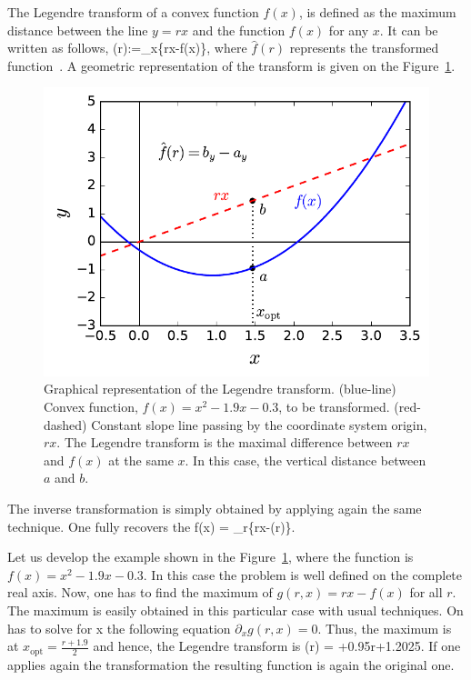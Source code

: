 The Legendre transform of a convex function $f(x)$, is defined as the maximum distance between the line $y=rx$ and the function $f(x)$ for any $x$.
It can be written as follows,
\be
  (r):=\max_{x}\{rx-f(x)\},
\ee
where $\hat{f}(r)$ represents the transformed function~\cite{Rockafellar1996}.
A geometric representation of the transform is given on the Figure~\ref{fig:lt-geometric-legendre}.

\begin{figure}[htp]
  \centering
  \includegraphics[scale=.65]{img/AP_legendre.pdf}
  \caption[Graphical representation of the Legendre transform.]{Graphical representation of the Legendre transform. (blue-line) Convex function, $f(x)=x^2-1.9x-0.3$, to be transformed. (red-dashed) Constant slope line passing by the coordinate system origin, $rx$. The Legendre transform is the maximal difference between $rx$ and $f(x)$ at the same $x$. In this case, the vertical distance between $a$ and $b$.}
  \label{fig:lt-geometric-legendre}
\end{figure}

The inverse transformation is simply obtained by applying again the same technique.
One fully recovers the
\be
  f(x) = \max_{r}\{rx-(r)\}.
\ee

Let us develop the example shown in the Figure~\ref{fig:lt-geometric-legendre}, where the function is $f(x)=x^2-1.9x-0.3$.
In this case the problem is well defined on the complete real axis.
Now, one has to find the maximum of $g(r,x)=rx-f(x)$ for all $r$.
The maximum is easily obtained in this particular case with usual techniques.
On has to solve for x the following equation $\partial_x g(r,x) = 0$. Thus, the maximum is at $x_{\text{opt}} = \frac{r+1.9}{2}$ and hence, the Legendre transform is
\be
  (r) = +0.95r+1.2025.
\ee
If one applies again the transformation the resulting function is again the original one.

